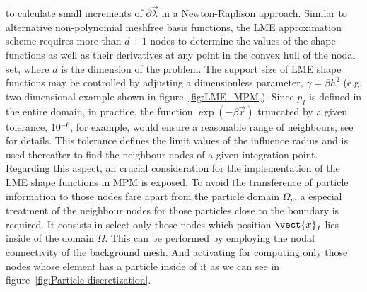 to calculate small increments of $\partial\vec{\lambda}$ in a
Newton-Raphson approach. Similar to alternative non-polynomial meshfree basis functions, the
LME approximation scheme requires more than $d+1$ nodes to determine
the values of the shape functions as well as their derivatives at any
point in the convex hull of the nodal set, where $d$ is the dimension
of the problem. The support size of LME shape functions may be
controlled by adjusting a dimensionless parameter, $\gamma=\beta h^2$
\cite{Arroyo2006} (e.g. two dimensional example shown in figure~\ref{fig:LME_MPM}).
 Since  $p_I$  is defined in the entire domain, in practice, the
function $\exp(-\beta \vec{r} )$ truncated  by  a given tolerance,
10$^{-6}$, for example,  would ensure a reasonable range of
neighbours, see \cite{Arroyo2006} for details. This tolerance defines
the limit values of the influence radius and is used thereafter to
find the neighbour nodes of a given integration point. Regarding this
aspect, an crucial consideration for the implementation of the LME
shape functions in MPM is exposed. To avoid the transference of
particle information to those nodes fare apart from the particle
domain $\Omega_p$, a especial treatment of the neighbour nodes for
those particles close to the boundary is required. It consists in
select only those nodes which position $\vect{x}_I$ lies inside of the
domain $\Omega$. This can be performed by employing the nodal
connectivity of the background mesh. And activating for computing only
those nodes whose element has a particle inside of it as we can see in
figure~\ref{fig:Particle-discretization}. 
